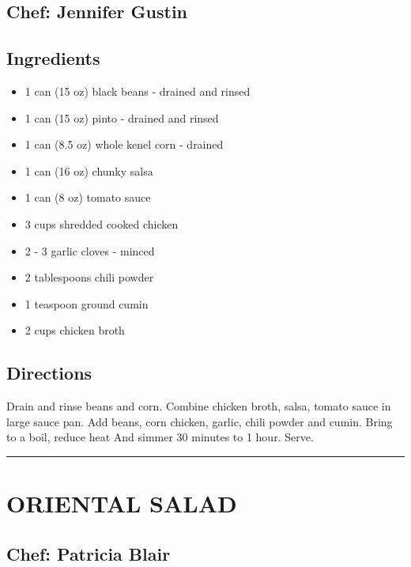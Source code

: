 \documentclass[
]{book}
\providecommand{\tightlist}{%
  \setlength{\itemsep}{0pt}\setlength{\parskip}{0pt}}
\begin{document}
\hypertarget{chef-jennifer-gustin-5}{%
\subsection*{Chef: Jennifer Gustin}\label{chef-jennifer-gustin-5}}


\hypertarget{ingredients-21}{%
\subsection*{Ingredients}\label{ingredients-21}}


\begin{itemize}
\tightlist
\item
  1 can (15 oz) black beans - drained and rinsed
\item
  1 can (15 oz) pinto - drained and rinsed
\item
  1 can (8.5 oz) whole kenel corn - drained
\item
  1 can (16 oz) chunky salsa
\item
  1 can (8 oz) tomato sauce
\item
  3 cups shredded cooked chicken
\item
  2 - 3 garlic cloves - minced
\item
  2 tablespoons chili powder
\item
  1 teaspoon ground cumin
\item
  2 cups chicken broth
\end{itemize}

\hypertarget{directions-21}{%
\subsection*{Directions}\label{directions-21}}


Drain and rinse beans and corn. Combine chicken broth, salsa, tomato sauce in large sauce pan. Add beans, corn chicken, garlic, chili powder and cumin. Bring to a boil, reduce heat And simmer 30 minutes to 1 hour. Serve.

\begin{center}\rule{0.5\linewidth}{0.5pt}\end{center}

\hypertarget{oriental-salad}{%
\section*{ORIENTAL SALAD}\label{oriental-salad}}


\hypertarget{chef-patricia-blair-6}{%
\subsection*{Chef: Patricia Blair}\label{chef-patricia-blair-6}}
\end{document}
